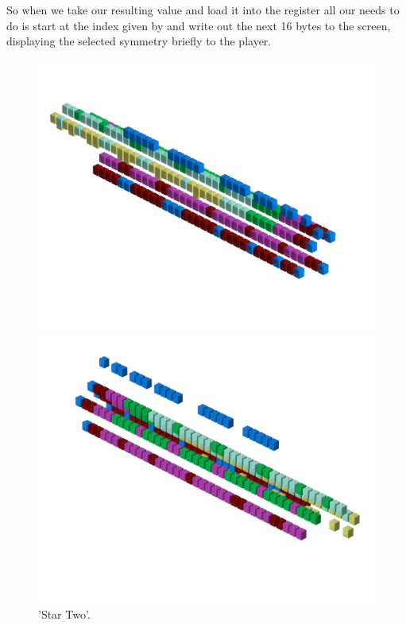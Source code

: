 So when we take our resulting value and load it into the  register all our  needs to do is start at the 
index given by  and write out the next 16 bytes to the screen, displaying the selected symmetry briefly to the player.
\clearpage
\rhead[]{\leftmark}
\begin{minipage}[b]{0.48\linewidth}
\begin{figure}[H]
    \centering
    \begin{adjustbox}{width=6cm,margin=0cm 0cm}
      \includegraphics[width=12cm]{src/patterns/pattern3-45.png}%
    \end{adjustbox}
    \begin{adjustbox}{width=6cm,margin=0cm -1.8cm}
      \includegraphics[width=12cm]{src/patterns/pattern3-225.png}%
    \end{adjustbox}
\caption{'Star Two'.}
\end{figure}
\end{minipage}
